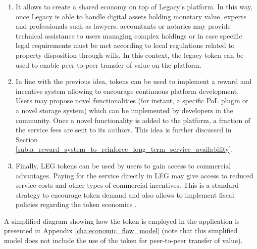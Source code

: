 \begin{enumerate}
	\item It allows to create a shared economy on top of Legacy's platform. In this way, once Legacy is able to handle digital assets holding monetary value, experts and professionals such as lawyers, accountants or notaries may provide technical assistance to users managing complex holdings or in case specific legal requirements must be met according to local regulations related to property disposition through wills. In this context, the legacy token can be used to enable peer-to-peer transfer of value on the platform.
	\item In line with the previous idea, tokens can be used to implement a reward and incentive system allowing to encourage continuous platform development. Users may propose novel functionalities (for instant, a specific PoL plugin or a novel storage system) which can be implemented by developers in the community. Once a novel functionality is added to the platform, a fraction of the service fees are sent to its authors.
	This idea is further discussed in Section \ref{sub:a_reward_system_to_reinforce_long_term_service_availability}.
	\item Finally, LEG tokens can be used by users to gain access to commercial advantages. Paying for the service directly in LEG may give access to reduced service costs and other types of commercial incentives. This is a standard strategy to encourage token demand and also allows to implement fiscal policies regarding the token economics \cite{Sehra2017}.

\end{enumerate}

A simplified diagram showing how the token is employed in the application is presented in Appendix \ref{cha:economic_flow_model} (note that this simplified model does not include the use of the token for peer-to-peer transfer of value).


